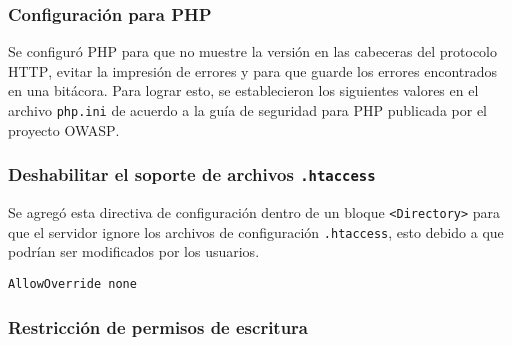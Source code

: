         \subsubsection{Configuraci\'{o}n para \textsc{PHP}}

Se configur\'{o} \textsc{PHP} para que no muestre la versi\'{o}n en las cabeceras del protocolo \textsc{HTTP}, evitar la impresi\'{o}n de errores y para que guarde los errores encontrados en una bit\'{a}cora. Para lograr esto, se establecieron los siguientes valores en el archivo \texttt{php.ini} de acuerdo a la gu\'{i}a de seguridad para \textsc{PHP} publicada por el proyecto \textsc{OWASP}\cite{_php_????}.

{
 \begin{table}[H]
 \caption{Directivas de seguridad de \textsc{PHP}}{}
 \noindent{} %
 \end{table}
}

        \subsubsection{Deshabilitar el soporte de archivos \texttt{.htaccess}}

Se agreg\'{o} esta directiva de configuraci\'{o}n dentro de un bloque \texttt{<Directory>} para que el servidor ignore los archivos de configuraci\'{o}n \texttt{.htaccess}, esto debido a que podr\'{i}an ser modificados por los usuarios.

{
\scriptsize
\linespread{1}
\begin{verbatim}
AllowOverride none
\end{verbatim}
}

        \subsubsection{Restricci\'{o}n de permisos de escritura}

